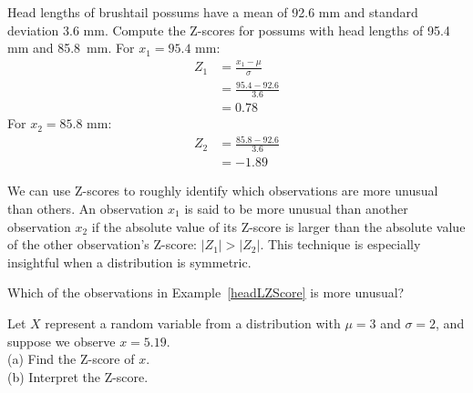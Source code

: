\begin{examplewrap}
\begin{nexample} 
{Head lengths of brushtail possums have a mean of 92.6 mm and standard deviation 3.6 mm.
Compute the Z-scores for possums with head lengths of 95.4 mm
and 85.8~mm.}
\label{headLZScore}%
For $x_1=95.4$ mm:
\begin{align*}
    Z_1&= \frac{x_1 - \mu}{\sigma}\\
      &= \frac{95.4 - 92.6}{3.6}\\
      &= 0.78
\end{align*}
    For $x_2=85.8$ mm:
\begin{align*}
    Z_2 &= \frac{85.8 - 92.6}{3.6} \\
&= -1.89
\end{align*}
\end{nexample}
\end{examplewrap}


We can use Z-scores to roughly identify which observations
are more unusual than others.
An observation $x_1$ is said to be more unusual than another
observation $x_2$ if the absolute value of its Z-score is larger
than the absolute value of the other observation's Z-score:
$|Z_1| > |Z_2|$.
This technique is especially insightful when a distribution
is symmetric.

\begin{exercisewrap}
\begin{nexercise}
Which of the observations in Example~\ref{headLZScore}
is more unusual?\footnotemark
\end{nexercise}
\end{exercisewrap}

\begin{exercisewrap}
\begin{nexercise}
Let $X$ represent a random variable from a distribution with $\mu=3$ and $\sigma=2$,
and suppose we observe $x=5.19$. \\
(a)
    Find the Z-score of $x$. \\
(b)
    Interpret the Z-score.\footnotemark
\end{nexercise}
\end{exercisewrap}


